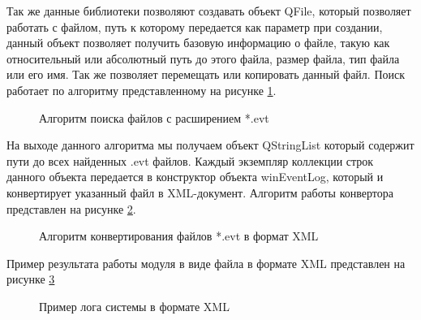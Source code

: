 Так же данные библиотеки позволяют создавать объект QFile, который позволяет работать с файлом, путь к которому передается как параметр при создании, данный объект позволяет получить базовую информацию о файле, такую как относительный или абсолютный путь до этого файла, размер файла, тип файла или его имя. Так же позволяет перемещать или копировать данный файл. Поиск работает по алгоритму представленному на рисунке \ref{evtsearch:evtSearch}.

\begin{figure}[ht]
\caption{Алгоритм поиска файлов с расширением *.evt}
\label{evtsearch:evtSearch}
\end{figure}

На выходе данного алгоритма мы получаем объект QStringList который содержит пути до всех найденных .evt файлов. Каждый экземпляр коллекции строк данного объекта передается в конструктор объекта winEventLog, который и конвертирует указанный файл в XML-документ. Алгоритм работы конвертора представлен на рисунке \ref{evtxml:evtToXML}.

\begin{figure}[ht]
\caption{Алгоритм конвертирования файлов *.evt в формат XML}
\label{evtxml:evtToXML}
\end{figure}

Пример результата работы модуля в виде файла в формате XML представлен на рисунке \ref{pic:log_win}

\begin{figure}[ht]
\caption{Пример лога системы в формате XML}
\label{pic:log_win}
\end{figure}
